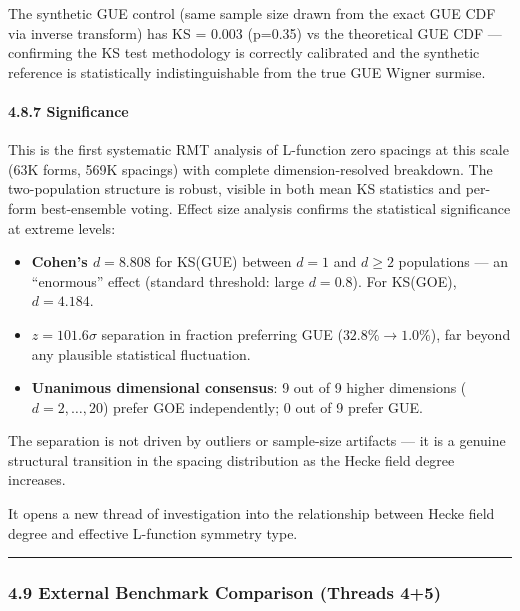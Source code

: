 \documentclass[
]{article}
\providecommand{\tightlist}{%
  \setlength{\itemsep}{0pt}\setlength{\parskip}{0pt}}
\begin{document}
The synthetic GUE control (same sample size drawn from the exact GUE CDF
via inverse transform) has KS = 0.003 (p=0.35) vs the theoretical GUE
CDF --- confirming the KS test methodology is correctly calibrated and
the synthetic reference is statistically indistinguishable from the true
GUE Wigner surmise.

\hypertarget{significance}{%
\paragraph{4.8.7 Significance}\label{significance}}

This is the first systematic RMT analysis of L-function zero spacings at
this scale (63K forms, 569K spacings) with complete dimension-resolved
breakdown. The two-population structure is robust, visible in both mean
KS statistics and per-form best-ensemble voting. Effect size analysis
confirms the statistical significance at extreme levels:

\begin{itemize}
\tightlist
\item
  \textbf{Cohen's \(d = 8.808\)} for KS(GUE) between \(d=1\) and
  \(d\ge 2\) populations --- an ``enormous'' effect (standard threshold:
  large \(d=0.8\)). For KS(GOE), \(d = 4.184\).
\item
  \textbf{\(z = 101.6\sigma\)} separation in fraction preferring GUE
  (\(32.8\% \to 1.0\%\)), far beyond any plausible statistical
  fluctuation.
\item
  \textbf{Unanimous dimensional consensus}: 9 out of 9 higher dimensions
  (\(d=2,\dots,20\)) prefer GOE independently; 0 out of 9 prefer GUE.
\end{itemize}

The separation is not driven by outliers or sample-size artifacts --- it
is a genuine structural transition in the spacing distribution as the
Hecke field degree increases.

It opens a new thread of investigation into the relationship between
Hecke field degree and effective L-function symmetry type.

\begin{center}\rule{0.5\linewidth}{0.5pt}\end{center}

\hypertarget{external-benchmark-comparison-threads-45}{%
\subsubsection{4.9 External Benchmark Comparison (Threads
4+5)}\label{external-benchmark-comparison-threads-45}}
\end{document}
